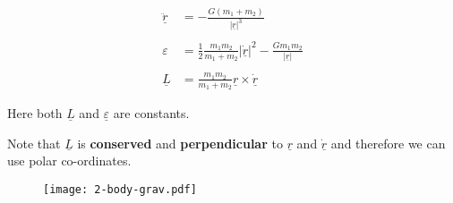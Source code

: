 \begin{align*}
	\underline{\ddot{r}} & = -\frac{G(m_{1} + m_{2})}{| \underline{r}|^{3} }                                                            \\ \\
  \varepsilon          & = \frac{1}{2}\frac{m_{1}m_{2}}{m_{1} + m_{2}}|\underline{\dot{r}}|^{2} - \frac{Gm_{1}m_{2}}{|\underline{r}|} \\ \\
  \underline{L} &= \frac{m_{1}m_{2}}{m_{1} + m_{2}}\underline{r} \times \underline{\dot{r}}
\end{align*}

\clearpage
Here both $\underline{L}$ and $\underline{\varepsilon}$ are constants.

\begin{remark}
  Note that $\underline{L}$ is {\bf conserved} and {\bf perpendicular} to
  $\underline{r}$ and $\underline{\dot{r}}$ and therefore we can use polar co-ordinates.

\end{remark}

\begin{figure}[H]
\centering
   \texttt{[image: 2-body-grav.pdf]}
   \label{fig:2-body-grav}
\end{figure}
